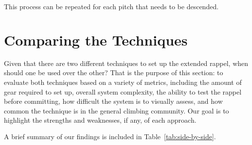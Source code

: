 \documentclass[nonacm,acmtog]{acmart}
\begin{document}
   This process can be repeated for each pitch that needs to be descended.


\section{Comparing the Techniques}
\label{sec:compare}

   Given that there are two different techniques to set up the extended rappel,
   when should one be used over the other?  That is the purpose of this
   section: to evaluate both techniques based on a variety of metrics,
   including the amount of gear required to set up, overall system complexity,
   the ability to test the rappel before committing, how difficult the system
   is to visually assess, and how common the technique is in the general
   climbing community.  Our goal is to highlight the strengths and weaknesses,
   if any, of each approach.

   A brief summary of our findings is included in Table~\ref{tab:side-by-side}.
\end{document}
